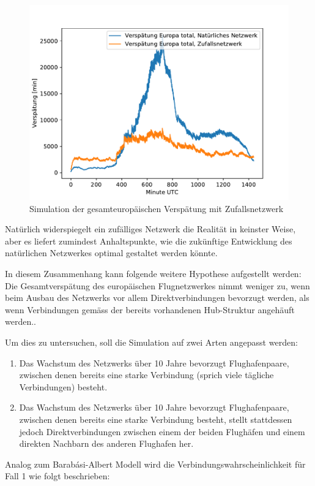 \begin{figure}
    \centering
    \includegraphics[width=0.75\linewidth]{images/total_delay_random.pdf}
    \caption{Simulation der gesamteuropäischen Verspätung mit Zufallsnetzwerk}
    \label{fig:total-delay-random}
\end{figure}

Natürlich widerspiegelt ein zufälliges Netzwerk die Realität in keinster Weise, aber es liefert zumindest Anhaltspunkte,
wie die zukünftige Entwicklung des natürlichen Netzwerkes optimal gestaltet werden könnte.

In diesem Zusammenhang kann folgende weitere Hypothese aufgestellt werden: \guillemotleft Die Gesamtverspätung des
europäischen Flugnetzwerkes nimmt weniger zu, wenn beim Ausbau des Netzwerks vor allem Direktverbindungen
bevorzugt werden, als wenn Verbindungen gemäss der bereits vorhandenen Hub-Struktur angehäuft werden.\guillemotright.

Um dies zu untersuchen, soll die Simulation auf zwei Arten angepasst werden:
\begin{enumerate}
    \item Das Wachstum des Netzwerks über 10 Jahre bevorzugt Flughafenpaare, zwischen denen bereits eine starke Verbindung (sprich viele tägliche Verbindungen) besteht.
    \item Das Wachstum des Netzwerks über 10 Jahre bevorzugt Flughafenpaare, zwischen denen bereits eine starke Verbindung besteht, stellt stattdessen jedoch Direktverbindungen zwischen einem der beiden Flughäfen und einem direkten Nachbarn des anderen Flughafen her.
\end{enumerate}

Analog zum Barabási-Albert Modell wird die Verbindungswahrscheinlichkeit für Fall 1 wie folgt beschrieben:

